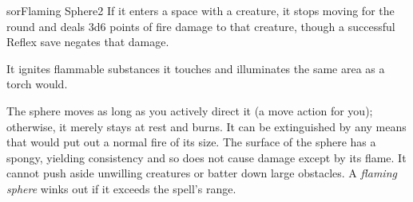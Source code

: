 \begin{spellcard}{sor}{Flaming Sphere}{2}
  If it enters a space with a creature,
  it stops moving for the round and deals 3d6 points of fire damage to that creature,
  though a successful Reflex save negates that damage.

  It ignites flammable substances it touches and illuminates the same area as a torch would.

  The sphere moves as long as you actively direct it (a move action for you);
  otherwise, it merely stays at rest and burns.
  It can be extinguished by any means that would put out a normal fire of its size.
  The surface of the sphere has a spongy, yielding consistency and so does not cause damage except by its flame.
  It cannot push aside unwilling creatures or batter down large obstacles.
  A \emph{flaming sphere} winks out if it exceeds the spell's range.
\end{spellcard}
